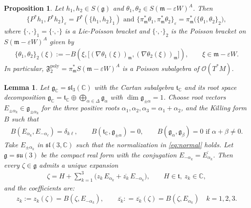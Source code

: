 \documentclass[10pt,a4paper]{amsart}
\newtheorem{proposition}{Proposition}
\newtheorem{lemma}{Lemma}
\begin{document}
 \begin{proposition}
 \label{prop:slicepoisson}
Let $h_1,h_2 \in S(\mathfrak{g})$ and $\theta_1,\theta_2\in S(\mathfrak{m}-\varepsilon W)^A$. Then %
\begin{align*}
\{P^*h_1,P^*h_2\}_\varepsilon = P^*\left(\{h_1,h_2\}_1\right) \text{ and } \{\pi_\mathfrak{m}^*\theta_1,\pi_\mathfrak{m}^*\theta_2\}_\varepsilon=\pi_\mathfrak{m}^*\bigl(\{\theta_1,\theta_2\}_2\bigr),
\end{align*} where $\{\cdot,\cdot\}_1 = \{\cdot,\cdot\} $ is a Lie-Poisson bracket and $\{\cdot,\cdot\}_2$ is the Poisson bracket on $S(\mathfrak{m}-\varepsilon W)^A$ given by \begin{align*}
\{\theta_1,\theta_2\}_2(\xi) :=-B \left(\xi,\bigl[(\nabla\theta_1(\xi))_{\mathfrak{m}},(\nabla\theta_2(\xi))_{\mathfrak{m}}\bigr]\right),
\qquad \xi\in \mathfrak{m}-\varepsilon W .
\end{align*}
In particular, $\mathfrak{F}_2^{\mathrm{poly}}=\pi_\mathfrak{m}^* S(\mathfrak{m}-\varepsilon W)^A$
is a Poisson subalgebra of $\mathcal{O}(T^* M)$.
\end{proposition}

\begin{lemma} 
\label{lem:root-coord}
Let $\mathfrak{g}_\mathbb{C}=\mathfrak{sl}_3(\mathbb{C})$ with the Cartan subalgebra $\mathfrak{t}_\mathbb{C}$ and its root space decomposition $\mathfrak{g}_\mathbb{C} = \mathfrak{t}_\mathbb{C}  \oplus \bigoplus_{\alpha\in\Delta}\mathfrak{g}_\alpha$ with $  \dim \mathfrak{g}_{\pm\alpha}=1$. Choose root vectors $E_{\pm\alpha_k}\in\mathfrak{g}_{\pm\alpha_k}$ for the three positive roots $\alpha_1,\alpha_2,\alpha_3=\alpha_1+\alpha_2$, and the Killing form $B$ such that
\begin{align}
B(E_{\alpha_k},E_{-\alpha_\ell})=\delta_{k\ell},\qquad B(\mathfrak{t}_\mathbb{C},\mathfrak{g}_{\pm\alpha})=0,\qquad B(\mathfrak{g}_\alpha,\mathfrak{g}_\beta)=0 \text{ if }\alpha+\beta\neq 0. \label{eq:normal} 
\end{align} Take $E_{\pm \alpha_k}$ in $\mathfrak{sl}(3,\mathbb{C})$ such that the normalization in \eqref{eq:normal} holds. Let $\mathfrak{g}=\mathfrak{su}(3)$ be the compact real form with the conjugation $E_{-\alpha_k}=\overline{E_{\alpha_k}}$. Then every $\zeta\in\mathfrak{g}$ admits a unique expansion \begin{align*}
\zeta = H +  \sum_{k=1}^3\Big(z_k\,E_{\alpha_k}+\overline{z_k}\,E_{-\alpha_k}\Big), \qquad H\in\mathfrak{t},\ z_k\in\mathbb{C},
\end{align*} and the coefficients are: \begin{align}
  z_k:=  z_k(\zeta) = B(\zeta,E_{-\alpha_k}),\qquad \overline{z_k} : = \overline{z_k}(\zeta)= B(\zeta,E_{\alpha_k}) \quad  k=1,2,3. \label{eq:complexcoe}
\end{align}
\end{lemma}
\end{document}

